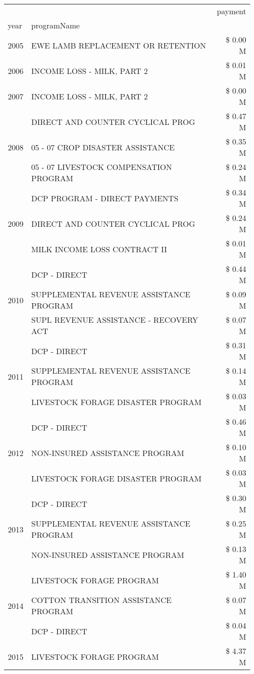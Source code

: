 \begin{tabular}{llr}
\toprule
 &  & payment \\
year & programName &  \\
\midrule
2005 & EWE LAMB REPLACEMENT OR RETENTION & \$ 0.00 M \\
\cline{1-3}
2006 & INCOME LOSS - MILK, PART 2 & \$ 0.01 M \\
\cline{1-3}
2007 & INCOME LOSS - MILK, PART 2 & \$ 0.00 M \\
\cline{1-3}
\multirow[t]{3}{*}{2008} & DIRECT AND COUNTER CYCLICAL PROG & \$ 0.47 M \\
 & 05 - 07 CROP DISASTER ASSISTANCE & \$ 0.35 M \\
 & 05 - 07 LIVESTOCK COMPENSATION PROGRAM & \$ 0.24 M \\
\cline{1-3}
\multirow[t]{3}{*}{2009} & DCP PROGRAM - DIRECT PAYMENTS & \$ 0.34 M \\
 & DIRECT AND COUNTER CYCLICAL PROG & \$ 0.24 M \\
 & MILK INCOME LOSS CONTRACT II & \$ 0.01 M \\
\cline{1-3}
\multirow[t]{3}{*}{2010} & DCP - DIRECT & \$ 0.44 M \\
 & SUPPLEMENTAL REVENUE ASSISTANCE PROGRAM & \$ 0.09 M \\
 & SUPL REVENUE ASSISTANCE - RECOVERY ACT & \$ 0.07 M \\
\cline{1-3}
\multirow[t]{3}{*}{2011} & DCP - DIRECT & \$ 0.31 M \\
 & SUPPLEMENTAL REVENUE ASSISTANCE PROGRAM & \$ 0.14 M \\
 & LIVESTOCK FORAGE DISASTER PROGRAM & \$ 0.03 M \\
\cline{1-3}
\multirow[t]{3}{*}{2012} & DCP - DIRECT & \$ 0.46 M \\
 & NON-INSURED ASSISTANCE PROGRAM & \$ 0.10 M \\
 & LIVESTOCK FORAGE DISASTER PROGRAM & \$ 0.03 M \\
\cline{1-3}
\multirow[t]{3}{*}{2013} & DCP - DIRECT & \$ 0.30 M \\
 & SUPPLEMENTAL REVENUE ASSISTANCE PROGRAM & \$ 0.25 M \\
 & NON-INSURED ASSISTANCE PROGRAM & \$ 0.13 M \\
\cline{1-3}
\multirow[t]{3}{*}{2014} & LIVESTOCK FORAGE PROGRAM & \$ 1.40 M \\
 & COTTON TRANSITION ASSISTANCE PROGRAM & \$ 0.07 M \\
 & DCP - DIRECT & \$ 0.04 M \\
\cline{1-3}
\multirow[t]{3}{*}{2015} & LIVESTOCK FORAGE PROGRAM & \$ 4.37 M \\

\end{tabular}
